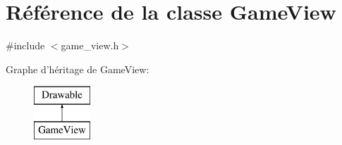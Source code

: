 \hypertarget{class_game_view}{\section{Référence de la classe Game\+View}
\label{class_game_view}
}


{\ttfamily \#include $<$game\+\_\+view.\+h$>$}

Graphe d'héritage de Game\+View\+:\begin{figure}[H]
\begin{center}
\leavevmode
\includegraphics[height=2.000000cm]{class_game_view}
\end{center}
\end{figure}

